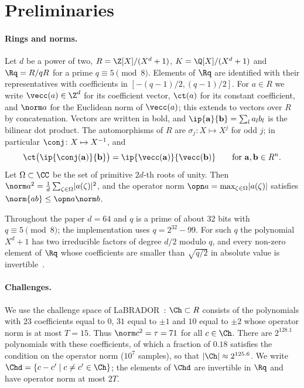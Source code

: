 \section{Preliminaries}\label{sec:prelim}

\paragraph{Rings and norms.}
Let $d$ be a power of two, $R=\Z[X]/(X^d+1)$, $K=\Q[X]/(X^d+1)$ and $\Rq=R/qR$ for a prime $q\equiv5\pmod 8$. Elements of $\Rq$ are identified with their representatives with coefficients in $[-(q-1)/2,(q-1)/2]$. For $a\in R$ we write $\vecc(a)\in\Z^d$ for its coefficient vector, $\ct(a)$ for its constant coefficient, and $\norm a$ for the Euclidean norm of $\vecc(a)$; this extends to vectors over $R$ by concatenation. Vectors are written in bold, and $\ip{\mathbf a}{\mathbf b}=\sum_la_lb_l$ is the bilinear dot product. The automorphisms of $R$ are $\sigma_j\colon X\mapsto X^j$ for odd $j$; in particular $\conj\colon X\mapsto X^{-1}$, and
\begin{equation}\label{eq:ct}
\ct\bigl(\ip{\conj(\mathbf a)}{\mathbf b}\bigr)=\ip{\vecc(\mathbf a)}{\vecc(\mathbf b)}\qquad\text{for }\mathbf a,\mathbf b\in R^n .
\end{equation}
Let $\Omega\subset\CC$ be the set of primitive $2d$-th roots of unity. Then $\norm a^2=\frac1d\sum_{\zeta\in\Omega}\lvert a(\zeta)\rvert^2$, and the operator norm $\opn a=\max_{\zeta\in\Omega}\lvert a(\zeta)\rvert$ satisfies $\norm{ab}\le\opn a\norm b$.

Throughout the paper $d=64$ and $q$ is a prime of about 32 bits with $q\equiv5\pmod8$; the implementation uses $q=2^{32}-99$. For such $q$ the polynomial $X^d+1$ has two irreducible factors of degree $d/2$ modulo $q$, and every non-zero element of $\Rq$ whose coefficients are smaller than $\sqrt{q/2}$ in absolute value is invertible~\cite{LS18}.

\paragraph{Challenges.}
We use the challenge space of LaBRADOR~\cite{BS23}: $\Ch\subset R$ consists of the polynomials with $23$ coefficients equal to $0$, $31$ equal to $\pm1$ and $10$ equal to $\pm2$ whose operator norm is at most $T=15$. Thus $\norm c^2=\tau=71$ for all $c\in\Ch$. There are $2^{128.1}$ polynomials with these coefficients, of which a fraction of $0.18$ satisfies the condition on the operator norm ($10^7$ samples), so that $\lvert\Ch\rvert\approx2^{125.6}$. We write $\Chd=\{c-c'\mid c\ne c'\in\Ch\}$; the elements of $\Chd$ are invertible in $\Rq$ and have operator norm at most $2T$.

